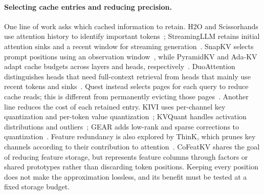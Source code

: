 \documentclass{article} %
\begin{document}
\paragraph{Selecting cache entries and reducing precision.} One line of work asks which cached information to retain. H2O and Scissorhands use attention history to identify important tokens~\citep{h2o,scissorhands}; StreamingLLM retains initial attention sinks and a recent window for streaming generation~\citep{streamingllm}. SnapKV selects prompt positions using an observation window~\citep{snapkv}, while PyramidKV and Ada-KV adapt cache budgets across layers and heads, respectively~\citep{pyramidkv,adakv}. DuoAttention distinguishes heads that need full-context retrieval from heads that mainly use recent tokens and sinks~\citep{duoattention}. Quest instead selects pages for each query to reduce cache reads; this is different from permanently evicting those pages~\citep{quest}. Another line reduces the cost of each retained entry. KIVI uses per-channel key quantization and per-token value quantization~\citep{kivi}; KVQuant handles activation distributions and outliers~\citep{kvquant}; GEAR adds low-rank and sparse corrections to quantization~\citep{gear}. Feature redundancy is also explored by ThinK, which prunes key channels according to their contribution to attention~\citep{think}. CoFeatKV shares the goal of reducing feature storage, but represents feature columns through factors or shared prototypes rather than discarding token positions. Keeping every position does not make the approximation lossless, and its benefit must be tested at a fixed storage budget.
\end{document}
